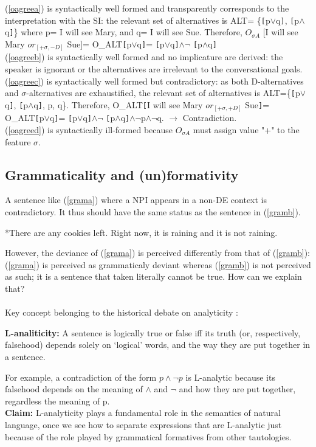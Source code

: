 \documentclass[a4paper,11pt]{article}
\newcommand{\reff}[1]{(\ref{#1})}
\begin{document}
\reff{oagreea} is syntactically well formed and transparently corresponds to the interpretation with the SI: the relevant set of alternatives is ALT= \{\verb![!p$\vee$q\verb!]!, \verb![!p$\wedge$q\verb!]!\} where p= I will see Mary, and q= I will see Sue. Therefore, $O_{\sigma A}$ [I will see Mary $or_{[+\sigma, -D]}$ Sue]= O_{ALT}\verb![!p$\vee$q\verb!]!= \verb![!p$\vee$q\verb!]!$\wedge\neg$ \verb![!p$\wedge$q\verb!]!
\\\reff{oagreeb} is syntactically well formed and no implicature  are derived: the speaker is ignorant or the alternatives are irrelevant to the conversational goals.
\\\reff{oagreec} is syntactically well formed but contradictory: as both D-alternatives and $\sigma$-alternatives are exhaustified, the relevant set of alternatives is ALT=\{\verb![!p$\vee$q\verb!]!, \verb![!p$\wedge$q\verb!]!, p, q\}. Therefore, O_{ALT}\verb![!I will see Mary $or_{[+\sigma,+D]}$ Sue\verb!]!= O_{ALT}\verb![!p$\vee$q\verb!]!= \verb![!p$\vee$q\verb!]!$\wedge\neg$ \verb![!p$\wedge$q\verb!]!$\wedge\neg$p$\wedge\neg$q. $\rightarrow$ Contradiction.
\\\reff{oagreed} is syntactically ill-formed because $O_{\sigma A}$  must assign value "+" to the feature $\sigma$.

\subsection{Grammaticality and (un)formativity}

A sentence like \reff{grama} where a NPI appears in a non-DE context is contradictory. It thus should have the same status as the sentence in \reff{gramb}.
 \begin{exe}
 \ex\label{gram} \begin{xlist}
 \ex\label{grama} *There are any cookies left.
 \ex\label{gramb} Right now, it is raining and it is not raining.
 \end{xlist}
 \end{exe}
 However, the deviance of (\ref{grama}) is perceived differently from that of (\ref{gramb}): (\ref{grama}) is perceived as grammaticaly deviant whereas (\ref{gramb}) is not perceived as such; it is a sentence that taken literally cannot be true. How can we explain that?
 \paragraph{}
 Key concept belonging to the historical debate on analyticity \citep{Car34,Qui60}: 
 \begin{exe}
 \ex \textbf{L-analiticity:} A sentence is logically true or false iff its truth (or, respectively, falsehood) depends solely on `logical' words, and the way they are put together in a sentence. 
 \end{exe}
 For example, a contradiction of the form $p\wedge \neg p$ is L-analytic because its falsehood depends on the meaning of $\wedge$ and $\neg$ and how they are put together, regardless the meaning of p.
 \\\textbf{Claim:} L-analyticity plays a fundamental role in the semantics of natural language, once we see how to separate expressions that are L-analytic just because of the role played by grammatical formatives from other tautologies.
\end{document}
